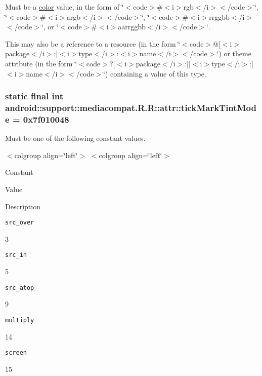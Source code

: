 Must be a \hyperlink{classandroid_1_1support_1_1mediacompat_1_1_r_1_1color}{color} value, in the form of \char`\"{}$<$code$>$\#$<$i$>$rgb$<$/i$>$$<$/code$>$\char`\"{}, \char`\"{}$<$code$>$\#$<$i$>$argb$<$/i$>$$<$/code$>$\char`\"{}, \char`\"{}$<$code$>$\#$<$i$>$rrggbb$<$/i$>$$<$/code$>$\char`\"{}, or \char`\"{}$<$code$>$\#$<$i$>$aarrggbb$<$/i$>$$<$/code$>$\char`\"{}. 

This may also be a reference to a resource (in the form \char`\"{}$<$code$>$@\mbox{[}$<$i$>$package$<$/i$>$:\mbox{]}$<$i$>$type$<$/i$>$:$<$i$>$name$<$/i$>$$<$/code$>$\char`\"{}) or theme attribute (in the form \char`\"{}$<$code$>$?\mbox{[}$<$i$>$package$<$/i$>$:\mbox{]}\mbox{[}$<$i$>$type$<$/i$>$:\mbox{]}$<$i$>$name$<$/i$>$$<$/code$>$\char`\"{}) containing a value of this type. \hypertarget{classandroid_1_1support_1_1mediacompat_1_1_r_1_1attr_ef89c0d31633dabcfd5d7ab71a121dc3}{
\subsubsection[{tickMarkTintMode}]{\setlength{\rightskip}{0pt plus 5cm}static final int android::support::mediacompat.R.R::attr::tickMarkTintMode = 0x7f010048}}
\label{classandroid_1_1support_1_1mediacompat_1_1_r_1_1attr_ef89c0d31633dabcfd5d7ab71a121dc3}


Must be one of the following constant values. \begin{TabularC}{0}
\hline
\end{TabularC}
$<$colgroup align=\char`\"{}left\char`\"{}$>$ $<$colgroup align=\char`\"{}left\char`\"{}$>$ 

Constant

Value

Description 

{\tt src\_\-over}

3

{\tt src\_\-in}

5

{\tt src\_\-atop}

9

{\tt multiply}

14

{\tt screen}

15


